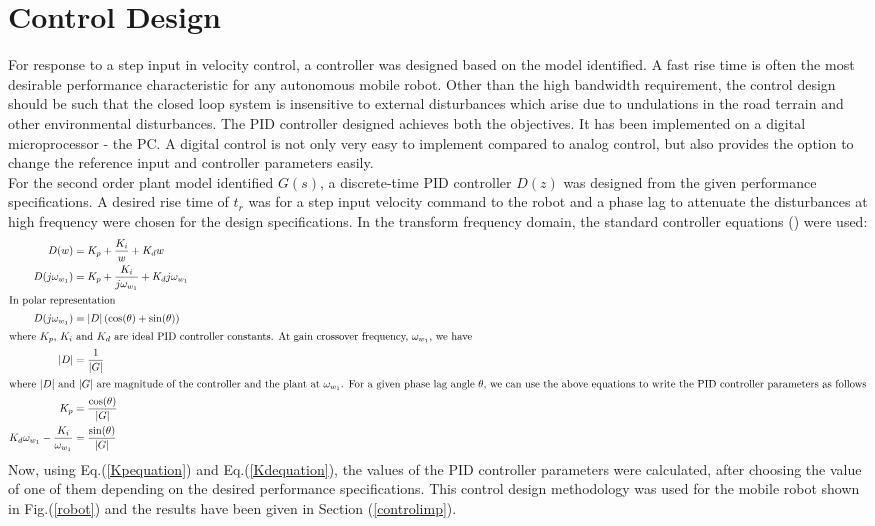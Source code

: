 \documentclass[conference]{IEEEtran}
\begin{document}
\section{Control Design}
For response to a step input in velocity control, a controller was designed based on the model identified. A fast rise time is often the most desirable performance characteristic for any autonomous mobile robot. Other than the high bandwidth requirement, the control design should be such that the closed loop system is insensitive to external disturbances which arise due to undulations in the road terrain and other environmental disturbances. The PID controller designed achieves both the objectives. It has been implemented on a digital microprocessor - the PC. A digital control is not only very easy to implement compared to analog control, but also provides the option to change the reference input and controller parameters easily. \\
For the second order plant model identified $G(s)$, a discrete-time PID controller $D(z)$ was designed from the given performance specifications. A desired rise time of $t_{r}$ was for a step input velocity command to the robot and a phase lag to attenuate the disturbances at high frequency were chosen for the design specifications. In the transform frequency domain, the standard controller equations (\cite{ogata}) were used:
\begin{align}
D(w) &= K_{p} + \frac{K_{i}}{w} + K_{d}w\\
D(j\omega_{w_{1}}) &=  K_{p} + \frac{K_{i}}{j\omega_{w_{1}}} + K_{d}j\omega_{w_{1}}\\
\intertext{In polar representation}
D(j\omega_{w_{1}}) &= \left|D\right|\left(\cos(\theta) + \sin(\theta)\right)\\
\intertext{where $K_{p}$, $K_{i}$ and $K_{d}$ are ideal PID controller constants. At gain crossover frequency, $\omega_{w_{1}}$, we have}
\left|D\right| &= \frac{1}{\left|G\right|}\\
\intertext{where $\left|D\right|$ and $\left|G\right|$ are magnitude of the controller and the plant at $\omega_{w_{1}}$. For a given phase lag angle $\theta$, we can use the above equations to write the PID controller parameters as follows}
\label{Kpequation}
K_{p} &= \frac{\cos(\theta)}{\left|G\right|}\\
\label{Kdequation}
K_{d}\omega_{w_{1}} -\frac{K_{i}}{\omega_{w_{1}}} &= \frac{\sin(\theta)}{\left|G\right|}
\end{align}
Now, using Eq.(\ref{Kpequation}) and Eq.(\ref{Kdequation}), the values of the PID controller parameters were calculated, after choosing the value of one of them depending on the desired performance specifications. This control design methodology was used for the mobile robot shown in Fig.(\ref{robot}) and the results have been given in Section (\ref{controlimp}). 
\end{document}
